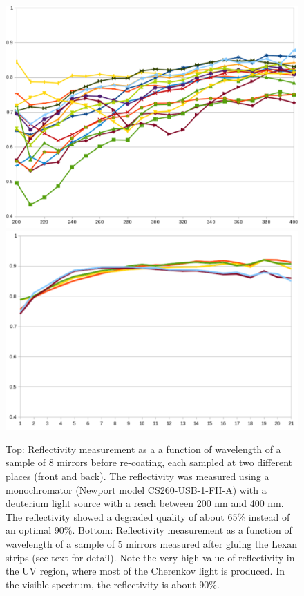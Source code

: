 \begin{figure}
\centering
	\includegraphics[width=0.97\columnwidth, height=0.7\columnwidth]{img/mirrorsReflectivityBefore.png}
	\includegraphics[width=0.99\columnwidth, height=0.7\columnwidth]{img/mirrorsReflectivityAfter.png}
	\caption{Top: Reflectivity measurement as a a function of wavelength of a sample of 8 mirrors before re-coating,
            each sampled at two different places (front and back). The reflectivity
				was measured using a monochromator (Newport model CS260-USB-1-FH-A) with a deuterium light source with a reach
            between 200 nm and 400 nm. The reflectivity showed a degraded quality of about 65$\%$ instead of an optimal 90$\%$.
			   Bottom: Reflectivity measurement as a function of wavelength of a sample of 5 mirrors measured after gluing the Lexan strips (see text for detail).
            Note the very high value of reflectivity in the UV region, where most of the Cherenkov light is produced. In the visible spectrum,
            the reflectivity is about 90$\%$.}
	\label{fig:reflectivityBeforeAndAfter}
\end{figure}


